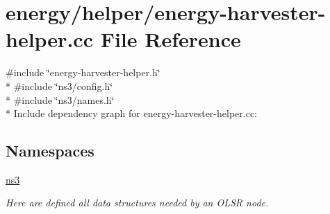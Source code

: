 \hypertarget{energy-harvester-helper_8cc}{}\section{energy/helper/energy-\/harvester-\/helper.cc File Reference}
\label{energy-harvester-helper_8cc}
{\ttfamily \#include \char`\"{}energy-\/harvester-\/helper.\+h\char`\"{}}\\*
{\ttfamily \#include \char`\"{}ns3/config.\+h\char`\"{}}\\*
{\ttfamily \#include \char`\"{}ns3/names.\+h\char`\"{}}\\*
Include dependency graph for energy-\/harvester-\/helper.cc\+:
\subsection*{Namespaces}
\begin{DoxyCompactItemize}
\item 
 \hyperlink{namespacens3}{ns3}
\begin{DoxyCompactList}\small\item\em Here are defined all data structures needed by an O\+L\+SR node. \end{DoxyCompactList}\end{DoxyCompactItemize}
